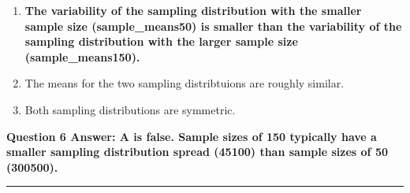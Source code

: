 \documentclass[]{article}
\begin{document}
\begin{enumerate}
\def\labelenumi{\Alph{enumi})}
\itemsep1pt\parskip0pt
\item
  \textbf{The variability of the sampling distribution with the smaller
  sample size (sample\_means50) is smaller than the variability of the
  sampling distribution with the larger sample size (sample\_means150).}
\item
  The means for the two sampling distribtuions are roughly similar.
\item
  Both sampling distributions are symmetric.
\end{enumerate}

\textbf{Question 6 Answer: A is false. Sample sizes of 150 typically
have a smaller sampling distribution spread (45100) than sample sizes of
50 (300500).}

\begin{center}\rule{0.5\linewidth}{\linethickness}\end{center}
\end{document}
